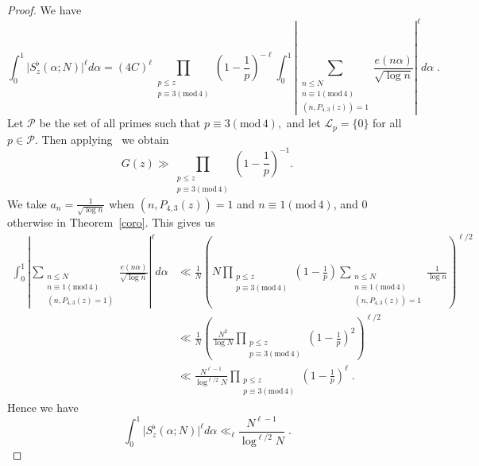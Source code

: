 \documentclass[12pt,article]{amsart}
\theoremstyle{remark}
\numberwithin{equation}{section}
\renewcommand{\pmod}[1]{\left(\mathrm{mod}\,#1\right)}
\newcommand{\calP}{\mathcal{P}}
\newcommand{\calL}{\mathcal{L}}
\begin{document}
	\begin{proof} 
		We have
		\[
		\int_0^1\biggl|S^\flat_z(\alpha;N)  \biggr|^\ell d\alpha=(4C)^\ell \prod_{\substack{p\leq z\\ p\equiv 3\pmod 4}}\left(1-\frac{1}{p}\right)^{-\ell} \int_{0}^1\left|\sum_{\substack{n\leq N\\ n\equiv 1\pmod 4\\ (n, P_{4,3}(z))=1}}\frac{e(n\alpha)}{\sqrt{\log n}}\right|^\ell d\alpha\; .
		\]
		Let $\calP$ be the set of all primes such that $p\equiv 3\pmod 4,$ and let $\calL_p=\{0\}$ for all $p\in\calP$. Then applying~\cite[Theorem A.3]{FI} we obtain
		\[G(z)\gg\prod_{\substack{p\leq z\\ p\equiv 3\pmod 4}}\left(1-\frac{1}{p}\right)^{-1}.\] We take $a_n=\frac{1}{\sqrt{\log n}}$ when $(n, P_{4,3}(z))=1$ and $n\equiv 1\pmod 4$, and $0$ otherwise in Theorem~\ref{coro}. This gives us 
		\begin{align*}
			\int_{0}^1|\sum_{\substack{n\leq N\\ n\equiv 1\pmod 4\\ (n, P_{4,3}(z)=1)}}\frac{e(n\alpha)}{\sqrt{\log n}}|^\ell d\alpha&\ll \frac{1}{N}\left(N\prod_{\substack{p\leq z\\ p\equiv 3\pmod 4}}\left(1-\frac{1}{p}\right)\sum_{\substack{n\leq N\\ n\equiv 1 \pmod 4\\ (n, P_{4,3}(z))=1}}\frac{1}{\log n} \right) ^{\ell/2}\\
			&\ll \frac{1}{N}\left(\frac{N^2}{\log N}\prod_{\substack{p\leq z\\ p\equiv 3\pmod 4}} \left(1-\frac{1}{p}\right)^2 \right) ^{\ell/2}\\
			&\ll \frac{N^{\ell-1}}{\log^{\ell/2} N}\prod_{\substack{p\leq z\\ p\equiv 3\pmod 4}}\left(1-\frac{1}{p}\right)^\ell\; .
		\end{align*}
		Hence we have 
		\[
		\int_0^1\biggl|S^\flat_z(\alpha;N)  \biggr|^\ell d\alpha\ll_{\ell} \frac{N^{\ell-1}}{\log^{\ell/2}N}\; .
		\]
	\end{proof}
	
\end{document}
